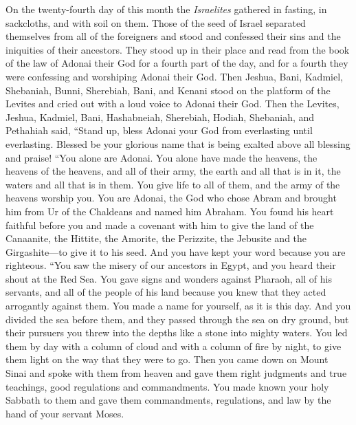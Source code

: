 \begin{biblechapter} %
 On the twenty-fourth day of this month the \textit{Israelites} gathered in fasting, in sackcloths, and with soil on them.
\verse Those of the seed of Israel separated themselves from all of the foreigners and stood and confessed their sins and the iniquities of their ancestors.
\verse They stood up in their place and read from the book of the law of Adonai their God for a fourth part of the day, and for a fourth they were confessing and worshiping Adonai their God.
\verse Then Jeshua, Bani, Kadmiel, Shebaniah, Bunni, Sherebiah, Bani, and Kenani stood on the platform of the Levites and cried out with a loud voice to Adonai their God.
\verse Then the Levites, Jeshua, Kadmiel, Bani, Hashabneiah, Sherebiah, Hodiah, Shebaniah, and Pethahiah said, “Stand up, bless Adonai your God from everlasting until everlasting. Blessed be your glorious name that is being exalted above all blessing and praise!
\verse “You alone are Adonai. You alone have made the heavens, the heavens of the heavens, and all of their army, the earth and all that is in it, the waters and all that is in them. You give life to all of them, and the army of the heavens worship you.
\verse You are Adonai, the God who chose Abram and brought him from Ur of the Chaldeans and named him Abraham.
\verse You found his heart faithful before you and made a covenant with him to give the land of the Canaanite, the Hittite, the Amorite, the Perizzite, the Jebusite and the Girgashite—to give it to his seed. And you have kept your word because you are righteous.
\verse “You saw the misery of our ancestors in Egypt, and you heard their shout at the Red Sea.
\verse You gave signs and wonders against Pharaoh, all of his servants, and all of the people of his land because you knew that they acted arrogantly against them. You made a name for yourself, as it is this day.
\verse And you divided the sea before them, and they passed through the sea on dry ground, but their pursuers you threw into the depths like a stone into mighty waters.
\verse You led them by day with a column of cloud and with a column of fire by night, to give them light on the way that they were to go.
\verse Then you came down on Mount Sinai and spoke with them from heaven and gave them right judgments and true teachings, good regulations and commandments.
\verse You made known your holy Sabbath to them and gave them commandments, regulations, and law by the hand of your servant Moses.

\end{biblechapter}
